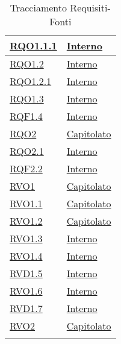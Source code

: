 \begin{longtable}{|>{\centering}m{5cm}|m{5cm}<{\centering}|}
\hyperlink{RQO1.1.1}{RQO1.1.1} &  \hyperlink{Interno}{Interno}\\ \hline

\hyperlink{RQO1.2}{RQO1.2} & \hyperlink{Interno}{Interno}\\ \hline

\hyperlink{RQO1.2.1}{RQO1.2.1} & \hyperlink{Interno}{Interno}\\ \hline

\hyperlink{RQO1.3}{RQO1.3} &  \hyperlink{Interno}{Interno}\\ \hline

\hyperlink{RQF1.4}{RQF1.4} & \hyperlink{Interno}{Interno}\\ \hline

\hyperlink{RQO2}{RQO2} & \hyperlink{Capitolato}{Capitolato}\\ \hline

\hyperlink{RQO2.1}{RQO2.1} & \hyperlink{Interno}{Interno}\\ \hline

\hyperlink{RQF2.2}{RQF2.2} & \hyperlink{Interno}{Interno}\\ \hline

\hyperlink{RVO1}{RVO1} &  \hyperlink{Capitolato}{Capitolato}\\ \hline

\hyperlink{RVO1.1}{RVO1.1} & \hyperlink{Capitolato}{Capitolato}\\ \hline

\hyperlink{RVO1.2}{RVO1.2} & \hyperlink{Capitolato}{Capitolato}\\ \hline

\hyperlink{RVO1.3}{RVO1.3} & \hyperlink{Interno}{Interno}\\ \hline

\hyperlink{RVO1.4}{RVO1.4} &\hyperlink{Interno}{Interno}\\ \hline

\hyperlink{RVD1.5}{RVD1.5} &  \hyperlink{Interno}{Interno}\\ \hline

\hyperlink{RVO1.6}{RVO1.6} &  \hyperlink{Interno}{Interno}\\ \hline

\hyperlink{RVD1.7}{RVD1.7} & \hyperlink{Interno}{Interno}\\ \hline

\hyperlink{RVO2}{RVO2} &  \hyperlink{Capitolato}{Capitolato}\\ \hline

\caption[Tracciamento Requisiti-Fonti]{Tracciamento Requisiti-Fonti}
\label{tabella:requi-fonti}
\end{longtable}
\clearpage

